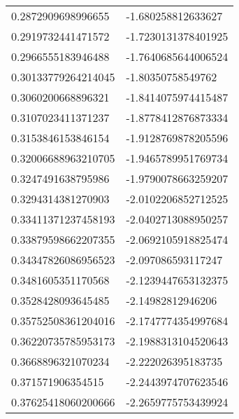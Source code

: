 \begin{supertabular}{ll}
0.2872909698996655  & -1.680258812633627   \\
0.2919732441471572  & -1.7230131378401925  \\
0.2966555183946488  & -1.7640685644006524  \\
0.30133779264214045 & -1.80350758549762    \\
0.3060200668896321  & -1.8414075974415487  \\
0.3107023411371237  & -1.8778412876873334  \\
0.3153846153846154  & -1.9128769878205596  \\
0.32006688963210705 & -1.9465789951769734  \\
0.3247491638795986  & -1.9790078663259207  \\
0.3294314381270903  & -2.0102206852712525  \\
0.33411371237458193 & -2.0402713088950257  \\
0.33879598662207355 & -2.0692105918825474  \\
0.34347826086956523 & -2.097086593117247   \\
0.3481605351170568  & -2.1239447653132375  \\
0.3528428093645485  & -2.14982812946206    \\
0.35752508361204016 & -2.1747774354997684  \\
0.36220735785953173 & -2.1988313104520643  \\
0.3668896321070234  & -2.222026395183735   \\
0.371571906354515   & -2.2443974707623546  \\
0.37625418060200666 & -2.2659775753439924  \\
\end{supertabular}

